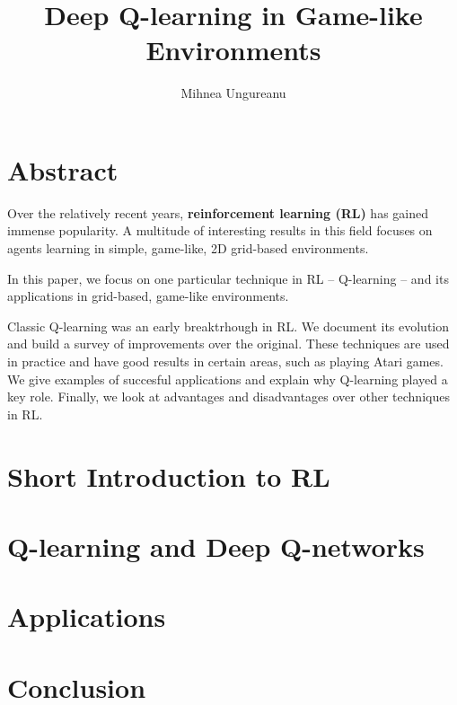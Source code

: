 \documentclass[12pt]{report}
\title{
    {Deep Q-learning in Game-like Environments}
}
\author{Mihnea Ungureanu}
\begin{document}
\maketitle

\chapter*{Abstract}
Over the relatively recent years, \textbf{reinforcement learning (RL)} has gained immense popularity.
A multitude of interesting results in this field focuses on agents learning in simple, game-like, 2D grid-based environments.

In this paper, we focus on one particular technique in RL -- Q-learning -- and its applications in grid-based, game-like environments.

Classic Q-learning was an early breaktrhough in RL.
We document its evolution and build a survey of improvements over the original.
These techniques are used in practice and have good results in certain areas, such as playing Atari games.
We give examples of succesful applications and explain why Q-learning played a key role.
Finally, we look at advantages and disadvantages over other techniques in RL.

\tableofcontents

\chapter{Short Introduction to RL}


\chapter{Q-learning and Deep Q-networks}


\chapter{Applications}


\chapter{Conclusion}



\end{document}
